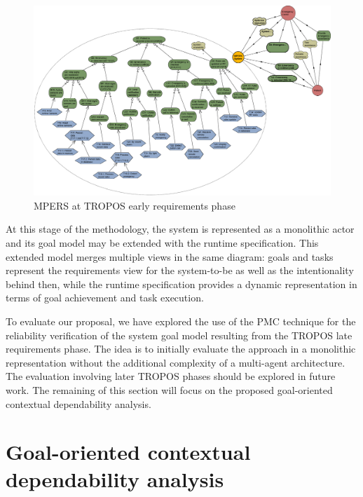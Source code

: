 \begin{figure}[h!]
\centering
\includegraphics[width=1\textwidth]{imgs/MPERS_LR.png}
\caption{MPERS at TROPOS early requirements phase}
\label{fig:MPERS_LR}
\end{figure}

At this stage of the methodology, the system is represented as a monolithic actor and its goal model may be extended with the runtime specification. This extended model merges multiple views in the same diagram: goals and tasks represent the requirements view for the system-to-be as well as the intentionality behind then, while the runtime specification provides a dynamic representation in terms of goal achievement  and task execution.

To evaluate our proposal, we have explored the use of the PMC technique for the reliability verification of the system goal model resulting from the TROPOS late requirements phase. The idea is to initially evaluate the approach in a monolithic representation without the additional complexity of a multi-agent architecture. The evaluation involving later TROPOS phases should be explored in future work. The remaining of this section will focus on the proposed goal-oriented contextual dependability analysis.

\section{Goal-oriented contextual dependability analysis}


